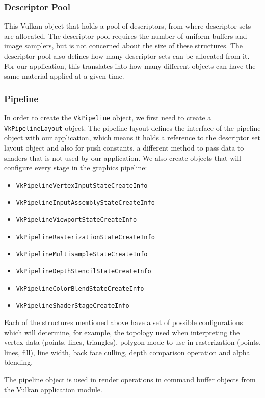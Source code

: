 \subsubsection{Descriptor Pool}
This Vulkan object that holds a pool of descriptors, from where descriptor sets are allocated. The descriptor pool requires the number of uniform buffers and image samplers, but is not concerned about the size of these structures. The descriptor pool also defines how many descriptor sets can be allocated from it. For our application, this translates into how many different objects can have the same material applied at a given time.

\subsubsection{Pipeline}
In order to create the \texttt{VkPipeline} object, we first need to create a \texttt{VkPipelineLayout} object. The pipeline layout defines the interface of the pipeline object with our application, which means it holds a reference to the descriptor set layout object and also for push constants, a different method to pass data to shaders that is not used by our application. We also create objects that will configure every stage in the graphics pipeline:

\begin{itemize}
    \item \texttt{VkPipelineVertexInputStateCreateInfo}
    \item \texttt{VkPipelineInputAssemblyStateCreateInfo}
    \item \texttt{VkPipelineViewportStateCreateInfo}
    \item \texttt{VkPipelineRasterizationStateCreateInfo}
    \item \texttt{VkPipelineMultisampleStateCreateInfo}
    \item \texttt{VkPipelineDepthStencilStateCreateInfo}
    \item \texttt{VkPipelineColorBlendStateCreateInfo}
    \item \texttt{VkPipelineShaderStageCreateInfo}
\end{itemize}

Each of the structures mentioned above have a set of possible configurations which will determine, for example, the topology used when interpreting the vertex data (points, lines, triangles), polygon mode to use in rasterization (points, lines, fill), line width, back face culling, depth comparison operation and alpha blending.

The pipeline object is used in render operations in command buffer objects from the Vulkan application module.
